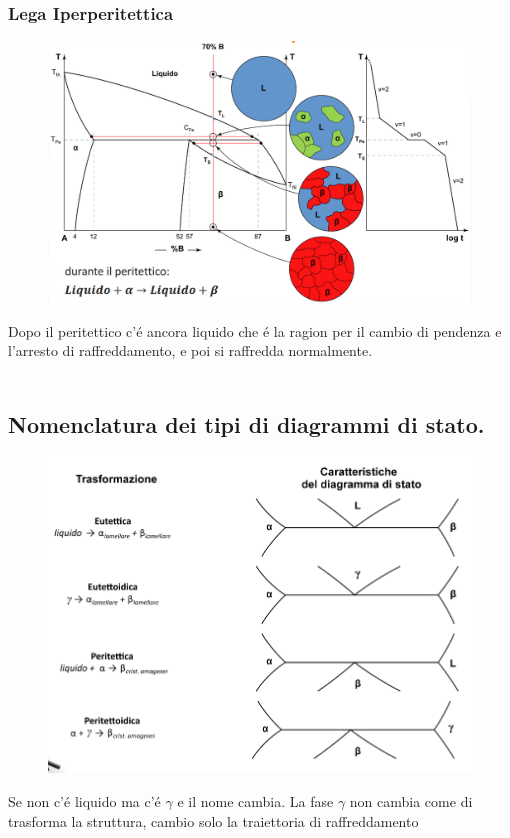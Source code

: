 \documentclass{article}
\begin{document}
{            \subsubsection{Lega Iperperitettica}
                \begin{figure}[h!]
                    \centering
                    \includegraphics[width=.85\linewidth]{Diagramma di stato e traietoria di raffreddamento per lega iperperitettica.png}
                \end{figure}
                Dopo il peritettico c'\'e ancora liquido che \'e la ragion per il cambio di pendenza e l'arresto di raffreddamento, e poi si raffredda normalmente.\\ \\
        \subsection{Nomenclatura dei tipi di diagrammi di stato.}
            \begin{figure}[h!]
                \centering
                \includegraphics[width=.85\linewidth]{L11 - Diagramma per la nomenclatura di tipi di diagrammi di stato.png}
            \end{figure}
            Se non c'\'e liquido ma c'\'e $\gamma$ e il nome cambia. La fase $\gamma$ non cambia come di trasforma la struttura, cambio solo la traiettoria di raffreddamento\\ \\
    \newpage

}
\end{document}
